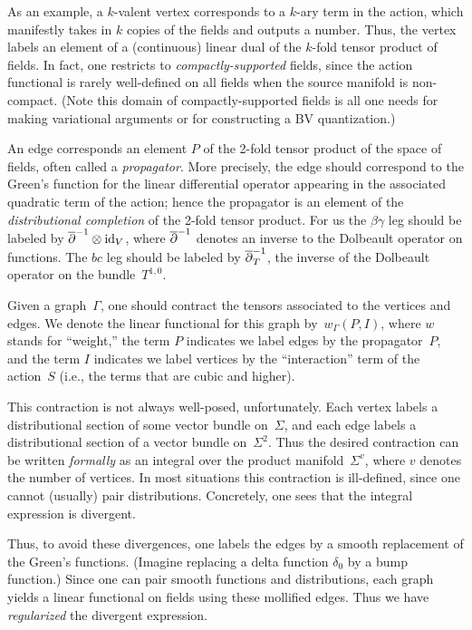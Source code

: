 As an example, a $k$-valent vertex corresponds to a $k$-ary term in the action,
which manifestly takes in $k$ copies of the fields and outputs a number.
Thus, the vertex labels an element of a (continuous) linear dual of the $k$-fold tensor product of fields.
In fact, one restricts to {\em compactly-supported} fields,
since the action functional is rarely well-defined on all fields when the source manifold is non-compact.
(Note this domain of compactly-supported fields is all one needs for making variational arguments or for constructing a BV quantization.)

An edge corresponds an element $P$ of the 2-fold tensor product of the space of fields,
often called a {\em propagator}.
More precisely, the edge should correspond to
the Green's function for the linear differential operator 
appearing in the associated quadratic term of the action;
hence the propagator is an element of the {\em distributional completion} of the 2-fold tensor product.
For us the $\beta\gamma$ leg should be labeled by $\overline{\partial}^{-1} \otimes {\rm id}_V$,
where $\overline{\partial}^{-1}$ denotes an inverse to the Dolbeault operator on functions.
The $bc$ leg should be labeled by $\overline{\partial}^{-1}_T$, 
the inverse of the Dolbeault operator on the bundle~$T^{1,0}$.

Given a graph~$\Gamma$, one should contract the tensors associated to the vertices and edges.
We denote the linear functional for this graph by~$w_\Gamma(P,I)$,
where $w$ stands for ``weight,'' the term $P$ indicates we label edges by the propagator~$P$,
and the term $I$ indicates we label vertices by the ``interaction'' term of the action~$S$ 
(i.e., the terms that are cubic and higher).

This contraction is not always well-posed, unfortunately.
Each vertex labels a distributional section of some vector bundle on~$\Sigma$,
and each edge labels a distributional section of a vector bundle on~$\Sigma^2$.
Thus the desired contraction can be written {\em formally} as an integral over the product manifold~$\Sigma^{v}$,
where $v$ denotes the number of vertices.
In most situations this contraction is ill-defined, 
since one cannot (usually) pair distributions.
Concretely, one sees that the integral expression is divergent.

Thus, to avoid these divergences, one labels the edges by a smooth replacement of the Green's functions. 
(Imagine replacing a delta function $\delta_0$ by a bump function.)
Since one can pair smooth functions and distributions,
each graph yields a linear functional on fields using these mollified edges.
Thus we have {\em regularized} the divergent expression.

